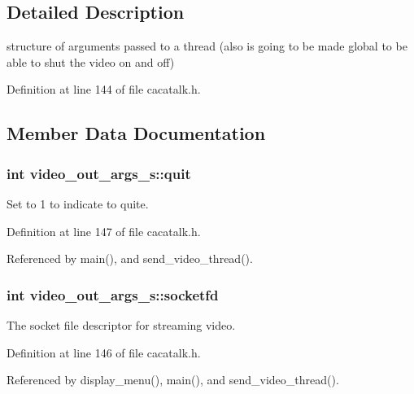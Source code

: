 \subsection{\-Detailed \-Description}
structure of arguments passed to a thread (also is going to be made global to be able to shut the video on and off) 

\-Definition at line 144 of file cacatalk.\-h.



\subsection{\-Member \-Data \-Documentation}
\hypertarget{structvideo__out__args__s_a3ccef1d0e1be0c01d38e75a4303fc46d}{
\subsubsection[{quit}]{\setlength{\rightskip}{0pt plus 5cm}int {\bf video\-\_\-out\-\_\-args\-\_\-s\-::quit}}}\label{structvideo__out__args__s_a3ccef1d0e1be0c01d38e75a4303fc46d}


\-Set to 1 to indicate to quite. 



\-Definition at line 147 of file cacatalk.\-h.



\-Referenced by main(), and send\-\_\-video\-\_\-thread().

\hypertarget{structvideo__out__args__s_aaf0a67c5a877ce3505ad692e62f40b27}{
\subsubsection[{socketfd}]{\setlength{\rightskip}{0pt plus 5cm}int {\bf video\-\_\-out\-\_\-args\-\_\-s\-::socketfd}}}\label{structvideo__out__args__s_aaf0a67c5a877ce3505ad692e62f40b27}


\-The socket file descriptor for streaming video. 



\-Definition at line 146 of file cacatalk.\-h.



\-Referenced by display\-\_\-menu(), main(), and send\-\_\-video\-\_\-thread().

